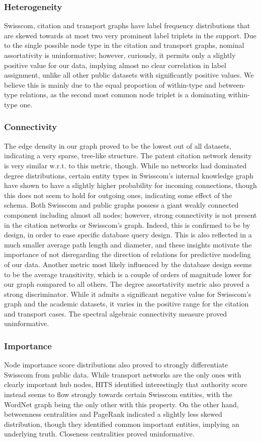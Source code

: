 \subsubsection{Heterogeneity} 
Swisscom, citation and transport graphs have label frequency distributions that are skewed towards at most two very prominent label triplets in the support. Due to the single possible node type in the citation and transport graphs, nominal assortativity is uninformative; however, curiously, it permits only a slightly positive value for our data, implying almost no clear correlation in label assignment, unlike all other public datasets with significantly positive values. We believe this is mainly due to the equal proportion of within-type and between-type relations, as the second most common node triplet is a dominating within-type one.

\subsubsection{Connectivity} 
The edge density in our graph proved to be the lowest out of all datasets, indicating a very sparse, tree-like structure. The patent citation network density is very similar w.r.t. to this metric, though. While no networks had dominated degree distributions, certain entity types in Swisscom's internal knowledge graph have shown to have a slightly higher probability for incoming connections, though this does not seem to hold for outgoing ones, indicating some effect of the schema. Both Swisscom and public graphs possess a giant weakly connected component including almost all nodes; however, strong connectivity is not present in the citation networks or Swisscom's graph. Indeed, this is confirmed to be by design, in order to ease specific database query design. This is also reflected in a much smaller average path length and diameter, and these insights motivate the importance of not disregarding the direction of relations for predictive modeling of our data. Another metric most likely influenced by the database design seems to be the average transitivity, which is a couple of orders of magnitude lower for our graph compared to all others. The degree assortativity metric also proved a strong discriminator. While it admits a significant negative value for Swisscom's graph and the academic datasets, it varies in the positive range for the citation and transport cases. The spectral algebraic connectivity measure proved uninformative.

\subsubsection{Importance} 
Node importance score distributions also proved to strongly differentiate Swisscom from public data. While transport networks are the only ones with clearly important hub nodes, HITS identified interestingly that authority score instead seems to flow strongly towards certain Swisscom entities, with the WordNet graph being the only other with this property. On the other hand, betweenness centralities and PageRank indicated a slightly less skewed distribution, though they identified common important entities, implying an underlying truth. Closeness centralities proved uninformative.

